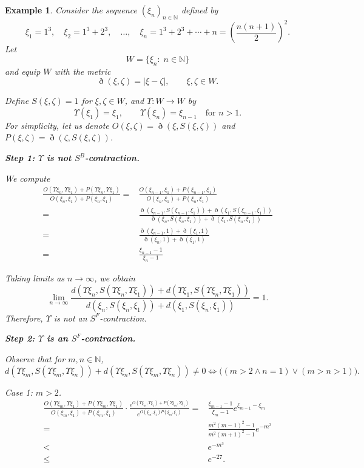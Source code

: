 \documentclass[pdflatex,sn-mathphys-num]{sn-jnl}%
\theoremstyle{thmstyleone}%
\theoremstyle{thmstyletwo}%
\newtheorem{example}{Example}%
\theoremstyle{thmstylethree}%
\begin{document}
\begin{example}
Consider the sequence $(\xi_n)_{n\in\mathbb N}$ defined by
\[
\xi_1=1^3,\quad \xi_2=1^3+2^3,\quad \ldots,\quad 
\xi_n=1^3+2^3+\cdots+n=\left(\frac{n(n+1)}{2}\right)^2.
\]
Let
\[
W=\{\xi_n:\; n\in\mathbb N\}
\]
and equip $W$ with the metric
\[
\eth(\xi,\zeta)=|\xi-\zeta|, \qquad \xi,\zeta \in W.
\]

Define $S(\xi,\zeta)=1$ for $\xi,\zeta \in W$,
and $\Upsilon :W\to W$ by
\[
\Upsilon(\xi_1)=\xi_1, \qquad 
\Upsilon(\xi_n)=\xi_{n-1} \quad \text{for } n>1.
\]
For simplicity, let us denote $O(\xi ,\zeta)=\eth(\xi,S(\xi,\zeta))$ and $P(\xi ,\zeta)=\eth(\zeta ,S(\xi,\zeta))$.
\medskip

\noindent
\textbf{Step 1: $\Upsilon $ is not \textit{$S^B$-contraction}.}

We compute
\begin{align*}
    \frac{O(\Upsilon \xi_n,\Upsilon \xi _1)+P(\Upsilon \xi_n,\Upsilon \xi _1)}{O(\xi_n,\xi_1)+P(\xi_n,\xi_1)}=&\frac{O(\xi_{n-1},\xi_1)+P(\xi_{n-1},\xi_1)}{O(\xi_n,\xi_1)+P(\xi_n,\xi_1)}\\
    =&\frac{\eth(\xi_{n-1},S(\xi_{n-1},\xi_1))+\eth(\xi_{1},S(\xi_{n-1},\xi_1))}{\eth(\xi_{n},S(\xi_{n},\xi_1))+\eth(\xi_{1},S(\xi_{n},\xi_1))} \\
    =& \frac{\eth(\xi_{n-1},1)+\eth(\xi_{1},1)}{\eth(\xi_{n},1)+\eth(\xi_{1},1)}\\
    =& \frac{\xi_{n-1}-1}{\xi_{n}-1}
\end{align*}

Taking limits as $n\to\infty$, we obtain
\[
\lim_{n\to\infty}
\frac{d(\Upsilon \xi_n,S(\Upsilon \xi_n,\Upsilon \xi _1))+d(\Upsilon \xi_1,S(\Upsilon \xi_n,\Upsilon \xi _1))}{d(\xi_n,S(\xi_n,\xi _1))+d(\xi_1,S(\xi_n,\xi _1))}=1.
\]
Therefore, $\Upsilon $ is not an \textit{$S^F$-contraction}.

\medskip

\noindent
\textbf{Step 2: $\Upsilon $ is an \textit{$S^F$-contraction}.}

Observe that for $m,n\in\mathbb N$,
\[
d(\Upsilon \xi_m,S(\Upsilon \xi_m,\Upsilon \xi _n))+d(\Upsilon \xi_n,S(\Upsilon \xi_m,\Upsilon \xi _n))\ne 0
\Longleftrightarrow
\big((m>2 \wedge n=1)\vee (m>n>1)\big).
\]

\medskip

\noindent
\emph{Case 1: $m>2$.}
\begin{align*}
    \frac{O(\Upsilon \xi_m,\Upsilon \xi _1)+P(\Upsilon \xi_m,\Upsilon \xi _1)}{O(\xi_m,\xi_1)+P(\xi_m,\xi_1)}
\cdot\frac{e^{O(\Upsilon \xi_m,\Upsilon \xi _1)+P(\Upsilon \xi_m,\Upsilon \xi _1)}}{e^{O(\xi_m,\xi_1)P(\xi_m,\xi_1)}}
=& \frac{\xi_{m-1}-1}{\xi_m-1}e^{\xi_{m-1}-\xi_m}\\
=& \frac{m^2(m-1)^2-1}{m^2(m+1)^2-1}e^{-m^3}\\
<& e^{-m^3}\\
\le& e^{-27}.
\end{align*}


\end{example}
\end{document}
